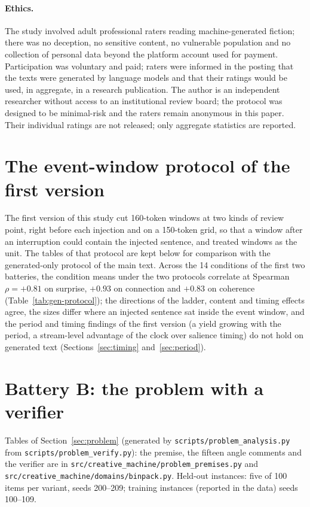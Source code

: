 \paragraph{Ethics.} The study involved adult professional raters reading
machine-generated fiction; there was no deception, no sensitive content, no
vulnerable population and no collection of personal data beyond the platform
account used for payment. Participation was voluntary and paid; raters were
informed in the posting that the texts were generated by language models and
that their ratings would be used, in aggregate, in a research publication.
The author is an independent researcher without access to an institutional
review board; the protocol was designed to be minimal-risk and the raters
remain anonymous in this paper. Their individual ratings are not released;
only aggregate statistics are reported.

\section{The event-window protocol of the first version}
\label{app:events}

The first version of this study cut 160-token windows at two kinds of review
point, right before each injection and on a 150-token grid, so that a window
after an interruption could contain the injected sentence, and treated
windows as the unit. The tables of that protocol are kept below for
comparison with the generated-only protocol of the main text. Across the 14
conditions of the first two batteries, the condition means under the two
protocols correlate at Spearman $\rho=+0.81$ on surprise, $+0.93$ on
connection and $+0.83$ on coherence (Table~\ref{tab:gen-protocol}); the
directions of the ladder, content and timing effects agree, the sizes differ
where an injected sentence sat inside the event window, and the period and
timing findings of the first version (a yield growing with the period, a
stream-level advantage of the clock over salience timing) do not hold on
generated text (Sections~\ref{sec:timing} and~\ref{sec:period}).

\section{Battery B: the problem with a verifier}
\label{app:problem}

Tables of Section~\ref{sec:problem} (generated by
\texttt{scripts/problem\_analysis.py} from \texttt{scripts/problem\_verify.py}):
the premise, the fifteen angle comments and the verifier are in
\texttt{src/creative\_machine/problem\_premises.py} and
\texttt{src/creative\_machine/domains/binpack.py}. Held-out instances: five
of 100 items per variant, seeds 200--209; training instances (reported in
the data) seeds 100--109.

